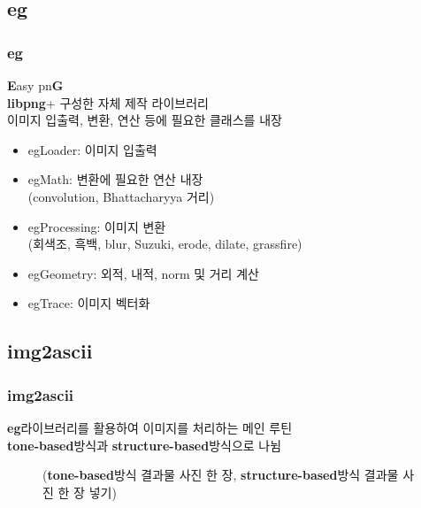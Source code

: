 \documentclass{beamer}
\newcommand{\spacing}{\hspace{0.3em}}
\newcommand{\eg}{\textbf{eg}}
\newcommand{\imgascii}{\textbf{img2ascii}}
\newcommand{\libpng}{\textbf{libpng}}
\newcommand{\Eigen}{\textbf{Eigen}}
\newcommand{\tonebased}{\textbf{tone-based}}
\newcommand{\structurebased}{\textbf{structure-based}}
\begin{document}
	\subsection{\eg}
	\begin{frame}{}
		\frametitle{\eg}
		\textbf{E}asy pn\textbf{G} \\
		\libpng \spacing +  구성한 자체 제작 라이브러리 \\
		이미지 입출력, 변환, 연산 등에 필요한 클래스를 내장
		\vspace{1em}
		\begin{itemize}
			\item egLoader: 이미지 입출력
			\item egMath: 변환에 필요한 연산 내장 \\ (convolution, Bhattacharyya 거리)
			\item egProcessing: 이미지 변환 \\ (회색조, 흑백, blur, Suzuki, erode, dilate, grassfire)
			\item egGeometry: 외적, 내적, norm 및 거리 계산
			\item egTrace: 이미지 벡터화
		\end{itemize}
	\end{frame}

	\subsection{\imgascii}
	\begin{frame}{}
		\frametitle{\imgascii}
		\eg \spacing 라이브러리를 활용하여 이미지를 처리하는 메인 루틴 \\
		\tonebased \spacing 방식과 \structurebased \spacing 방식으로 나뉨
		\begin{figure}
			(\tonebased \spacing 방식 결과물 사진 한 장, \structurebased \spacing 방식 결과물 사진 한 장 넣기)
		\end{figure}
	\end{frame}
\end{document}
